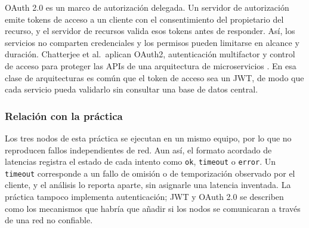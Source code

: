 OAuth 2.0 es un marco de autorización delegada. Un servidor de autorización emite
tokens de acceso a un cliente con el consentimiento del propietario del recurso,
y el servidor de recursos valida esos tokens antes de responder. Así, los servicios
no comparten credenciales y los permisos pueden limitarse en alcance y duración.
Chatterjee et al.\ aplican OAuth2, autenticación multifactor y control de acceso
para proteger las APIs de una arquitectura de microservicios \cite{herrera_chatterjee2022}.
En esa clase de arquitecturas es común que el token de acceso sea un JWT, de modo
que cada servicio pueda validarlo sin consultar una base de datos central.

\subsubsection{Relación con la práctica}

Los tres nodos de esta práctica se ejecutan en un mismo equipo, por lo que no
reproducen fallos independientes de red. Aun así, el formato acordado de latencias
registra el estado de cada intento como \texttt{ok}, \texttt{timeout} o \texttt{error}.
Un \texttt{timeout} corresponde a un fallo de omisión o de temporización observado
por el cliente, y el análisis lo reporta aparte, sin asignarle una latencia inventada.
La práctica tampoco implementa autenticación; JWT y OAuth 2.0 se describen como los
mecanismos que habría que añadir si los nodos se comunicaran a través de una red
no confiable.

